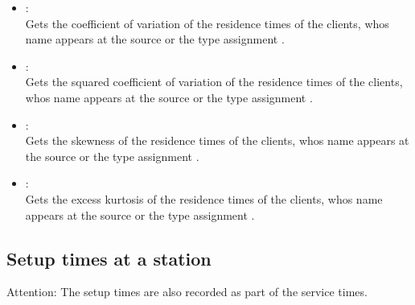 \begin{itemize}
\item
{}:\\
Gets the coefficient of variation of the residence times of the clients, whos name appears at the source or the type assignment .

\item
{}:\\
Gets the squared coefficient of variation of the residence times of the clients, whos name appears at the source or the type assignment .

\item
{}:\\
Gets the skewness of the residence times of the clients, whos name appears at the source or the type assignment .

\item
{}:\\
Gets the excess kurtosis of the residence times of the clients, whos name appears at the source or the type assignment .

\end{itemize}



\subsection{Setup times at a station}

Attention: The setup times are also recorded as part of the service times.

